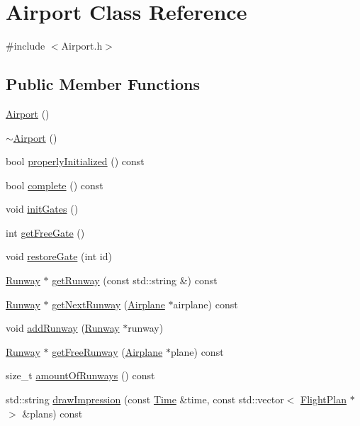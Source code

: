 \hypertarget{classAirport}{}\section{Airport Class Reference}
\label{classAirport}


{\ttfamily \#include $<$Airport.\+h$>$}

\subsection*{Public Member Functions}
\begin{DoxyCompactItemize}
\item 
\hyperlink{classAirport_a2fc0f2402c94225b9deaf76176bb887f}{Airport} ()
\item 
\hyperlink{classAirport_a2c42073a186171586f3ac66d84af97ca}{$\sim$\+Airport} ()
\item 
bool \hyperlink{classAirport_a1ac3a730b557a36ac7521cce6ab64722}{properly\+Initialized} () const 
\item 
bool \hyperlink{classAirport_a76819017f88f563183bd16a0b4da4e40}{complete} () const 
\item 
void \hyperlink{classAirport_ae207524a428ee2d93dd25ad5ef4fa1f7}{init\+Gates} ()
\item 
int \hyperlink{classAirport_a73b57b192084fb8082d912da70beb5b0}{get\+Free\+Gate} ()
\item 
void \hyperlink{classAirport_ad93ec78d36fa040b97e6ff2a806e5885}{restore\+Gate} (int id)
\item 
\hyperlink{classRunway}{Runway} $\ast$ \hyperlink{classAirport_a49a0963b8e15ad1fd299c9ccf2c97ab4}{get\+Runway} (const std\+::string \&) const 
\item 
\hyperlink{classRunway}{Runway} $\ast$ \hyperlink{classAirport_a894669e2c8865a6c0442004e7e75063c}{get\+Next\+Runway} (\hyperlink{classAirplane}{Airplane} $\ast$airplane) const 
\item 
void \hyperlink{classAirport_a346e81f1bbb8b9eb9a0eee341d947fc1}{add\+Runway} (\hyperlink{classRunway}{Runway} $\ast$runway)
\item 
\hyperlink{classRunway}{Runway} $\ast$ \hyperlink{classAirport_a760fd9c19e06fa37362006e42153ca0a}{get\+Free\+Runway} (\hyperlink{classAirplane}{Airplane} $\ast$plane) const 
\item 
size\+\_\+t \hyperlink{classAirport_a587d39bfd3934a70f94b42f40fe72245}{amount\+Of\+Runways} () const 
\item 
std\+::string \hyperlink{classAirport_a011dbf8ff05f8d6a2c52d2f39f365051}{draw\+Impression} (const \hyperlink{classTime}{Time} \&time, const std\+::vector$<$ \hyperlink{classFlightPlan}{Flight\+Plan} $\ast$ $>$ \&plans) const 

\end{DoxyCompactItemize}
